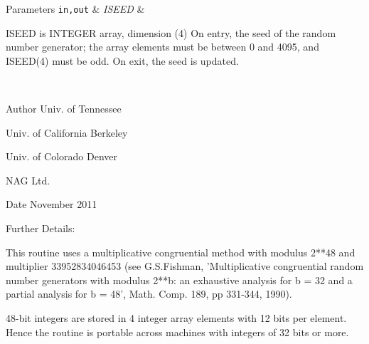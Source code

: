 \begin{DoxyParams}[1]{Parameters}
\mbox{\tt in,out}  & {\em I\+S\+E\+E\+D} & \begin{DoxyVerb}          ISEED is INTEGER array, dimension (4)
          On entry, the seed of the random number generator; the array
          elements must be between 0 and 4095, and ISEED(4) must be
          odd.
          On exit, the seed is updated.\end{DoxyVerb}
 \\
\hline
\end{DoxyParams}
\begin{DoxyAuthor}{Author}
Univ. of Tennessee 

Univ. of California Berkeley 

Univ. of Colorado Denver 

N\+A\+G Ltd. 
\end{DoxyAuthor}
\begin{DoxyDate}{Date}
November 2011 
\end{DoxyDate}
\begin{DoxyParagraph}{Further Details\+: }
\begin{DoxyVerb}  This routine uses a multiplicative congruential method with modulus
  2**48 and multiplier 33952834046453 (see G.S.Fishman,
  'Multiplicative congruential random number generators with modulus
  2**b: an exhaustive analysis for b = 32 and a partial analysis for
  b = 48', Math. Comp. 189, pp 331-344, 1990).

  48-bit integers are stored in 4 integer array elements with 12 bits
  per element. Hence the routine is portable across machines with
  integers of 32 bits or more.\end{DoxyVerb}
 
\end{DoxyParagraph}
